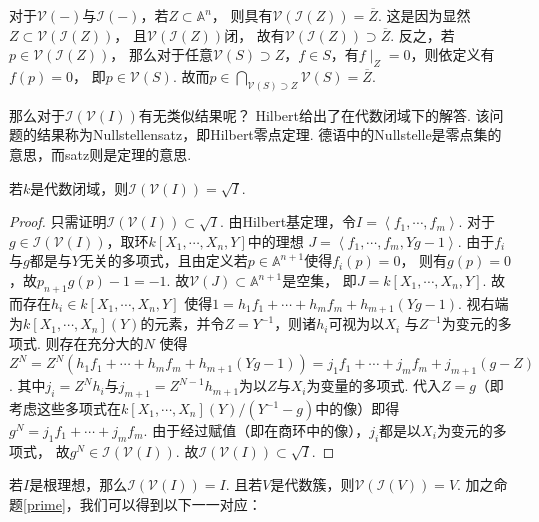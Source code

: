     对于$\mathcal{V}(-)$与$\mathcal{I}(-)$，若$Z \subset \mathbb{A}^{n}$，
    则具有$\mathcal{V}(\mathcal{I}(Z))=\overline{Z}$. 
    这是因为显然$Z \subset \mathcal{V}(\mathcal{I}(Z))$，
    且$\mathcal{V}(\mathcal{I}(Z))$闭，
    故有$\mathcal{V}(\mathcal{I}(Z)) \supset \overline{Z}$. 
    反之，若$p \in \mathcal{V}(\mathcal{I}(Z))$，
    那么对于任意$\mathcal{V}(S) \supset Z$，$f \in S$，有$f \mid_{Z}=0$，则依定义有$f(p)=0$，
    即$p \in \mathcal{V}(S)$. 故而$p \in \bigcap_{\mathcal{V}(S) \supset Z} \mathcal{V}(S) = \overline{Z}$. 
    
    那么对于$\mathcal{I}(\mathcal{V}(I))$有无类似结果呢？
    Hilbert给出了在代数闭域下的解答. 
    该问题的结果称为Nullstellensatz，即Hilbert零点定理. 
    德语中的Nullstelle是零点集的意思，而satz则是定理的意思.

    \begin{theorem}[强形式Hilbert零点定理]
      若$k$是代数闭域，则$\mathcal{I}(\mathcal{V}(I))=\sqrt{I}$.
    \end{theorem}
    \begin{proof}
      只需证明$\mathcal{I}(\mathcal{V}(I)) \subset \sqrt{I}$. 
      由Hilbert基定理，令$I=\left<f_{1},\cdots,f_{m}\right>$. 
      对于$g \in \mathcal{I}(\mathcal{V}(I))$，取环$k[X_{1},\cdots,X_{n},Y]$中的理想
      $J=\left<f_{1},\cdots,f_{m},Yg-1\right>$. 
      由于$f_{i}$与$g$都是与$Y$无关的多项式，且由定义若$p \in \mathbb{A}^{n+1}$使得$f_{i}(p)=0$，
      则有$g(p)=0$，故$p_{n+1}g(p)-1=-1$. 故$\mathcal{V}(J) \subset \mathbb{A}^{n+1}$是空集，
      即$J=k[X_{1},\cdots,X_{n},Y]$. 故而存在$h_{i} \in k[X_{1},\cdots,X_{n},Y]$
      使得$1=h_{1}f_{1}+\cdots+h_{m}f_{m}+h_{m+1}(Yg-1)$. 
      视右端为$k[X_{1},\cdots,X_{n}](Y)$的元素，并令$Z=Y^{-1}$，则诸$h_{i}$可视为以$X_{i}$
      与$Z^{-1}$为变元的多项式. 则存在充分大的$N$
      使得$Z^{N}=Z^{N}(h_{1}f_{1}+\cdots+h_{m}f_{m}+h_{m+1}(Yg-1))=j_{1}f_{1}+\cdots+j_{m}f_{m}+j_{m+1}(g-Z)$.
      其中$j_{i}=Z^{N}h_{i}$与$j_{m+1}=Z^{N-1}h_{m+1}$为以$Z$与$X_{i}$为变量的多项式.
      代入$Z=g$（即考虑这些多项式在$k[X_{1},\cdots,X_{n}](Y)/(Y^{-1}-g)$中的像）即得$g^{N}=j_{1}f_{1}+\cdots+j_{m}f_{m}$. 
      由于经过赋值（即在商环中的像），$j_{i}$都是以$X_{i}$为变元的多项式，
      故$g^{N} \in \mathcal{I}(\mathcal{V}(I))$. 故$\mathcal{I}(\mathcal{V}(I)) \subset \sqrt{I}$.
    \end{proof}

    若$I$是根理想，那么$\mathcal{I}(\mathcal{V}(I))=I$. 
    且若$V$是代数簇，则$\mathcal{V}(\mathcal{I}(V))=V$.
    加之命题\ref{prime}，我们可以得到以下一一对应：

